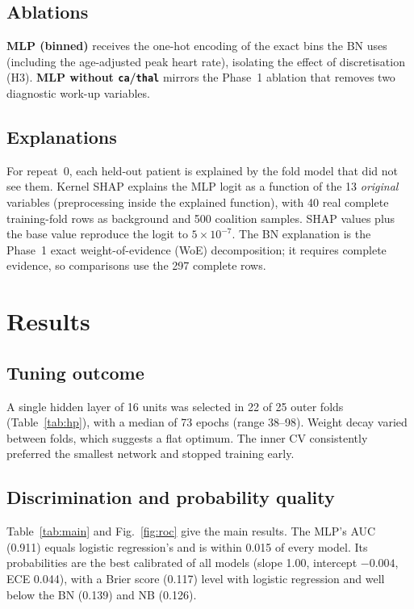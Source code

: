 \documentclass[conference]{IEEEtran}
\begin{document}
\subsection{Ablations}
\textbf{MLP (binned)} receives the one-hot encoding of the exact bins the BN uses (including the age-adjusted peak heart rate), isolating the effect of discretisation (H3). \textbf{MLP without \texttt{ca}/\texttt{thal}} mirrors the Phase~1 ablation that removes two diagnostic work-up variables.

\subsection{Explanations}
For repeat~0, each held-out patient is explained by the fold model that did not see them. Kernel SHAP explains the MLP logit as a function of the 13 \emph{original} variables (preprocessing inside the explained function), with 40 real complete training-fold rows as background and 500 coalition samples. SHAP values plus the base value reproduce the logit to $5\times10^{-7}$. The BN explanation is the Phase~1 exact weight-of-evidence (WoE) decomposition; it requires complete evidence, so comparisons use the 297 complete rows.

\section{Results}
\subsection{Tuning outcome}
A single hidden layer of 16 units was selected in 22 of 25 outer folds (Table~\ref{tab:hp}), with a median of 73 epochs (range 38--98). Weight decay varied between folds, which suggests a flat optimum. The inner CV consistently preferred the smallest network and stopped training early.

\begin{table}[!t]
\caption{MLP configurations chosen by nested CV (25 outer folds)}
\label{tab:hp}
\centering
\footnotesize\setlength{\tabcolsep}{3.5pt}

\end{table}

\subsection{Discrimination and probability quality}
Table~\ref{tab:main} and Fig.~\ref{fig:roc} give the main results. The MLP's AUC (0.911) equals logistic regression's and is within 0.015 of every model. Its probabilities are the best calibrated of all models (slope 1.00, intercept $-0.004$, ECE 0.044), with a Brier score (0.117) level with logistic regression and well below the BN (0.139) and NB (0.126).
\end{document}
